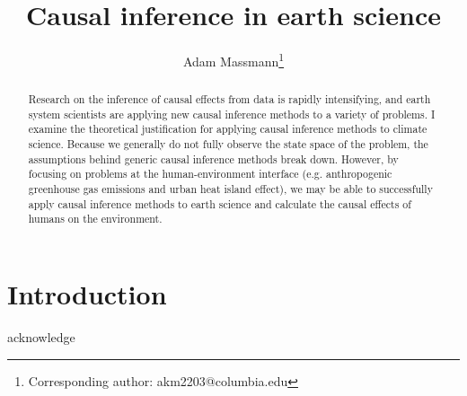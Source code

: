 \documentclass[12pt]{article}
\begin{document}
\title{Causal inference in earth science}

\author[1]{Adam Massmann\thanks{Corresponding author: akm2203@columbia.edu}}


\maketitle

\begin{abstract}
  Research on the inference of causal effects from data is rapidly
  intensifying, and earth system scientists are applying new causal
  inference methods to a variety of problems. I examine the
  theoretical justification for applying causal inference methods to
  climate science. Because we generally do not fully observe the state
  space of the problem, the assumptions behind generic causal
  inference methods break down. However, by focusing on problems at
  the human-environment interface (e.g. anthropogenic greenhouse gas
  emissions and urban heat island effect), we may be able to
  successfully apply causal inference methods to earth science and
  calculate the causal effects of humans on the environment.

\end{abstract}

\onehalfspacing

\section{Introduction}



\acknowledgments acknowledge
\end{document}
